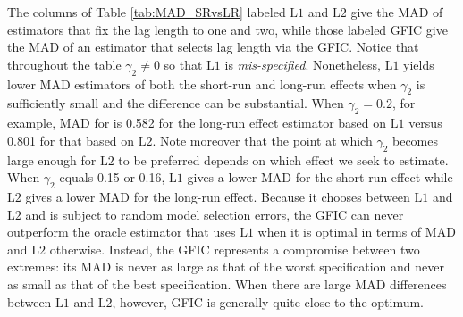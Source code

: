 The columns of Table \ref{tab:MAD_SRvsLR} labeled $\mbox{L1}$ and $\mbox{L2}$ give the MAD of estimators that fix the lag length to one and two, while those labeled GFIC give the MAD of an estimator that selects lag length via the GFIC.
Notice that throughout the table $\gamma_2 \neq 0$ so that $\mbox{L1}$ is \emph{mis-specified}.
Nonetheless, $\mbox{L1}$ yields lower MAD estimators of both the short-run and long-run effects when $\gamma_2$ is sufficiently small and the difference can be substantial.
When $\gamma_2 = 0.2$, for example, MAD for is 0.582 for the long-run effect estimator based on $\mbox{L1}$ versus 0.801 for that based on $\mbox{L2}$.
Note moreover that the point at which $\gamma_2$ becomes large enough for $\mbox{L2}$ to be preferred depends on which effect we seek to estimate.
When $\gamma_2$ equals 0.15 or 0.16, $\mbox{L1}$ gives a lower MAD for the short-run effect while $\mbox{L2}$ gives a lower MAD for the long-run effect.
Because it chooses between $\mbox{L1}$ and $\mbox{L2}$ and is subject to random model selection errors, the GFIC can never outperform the oracle estimator that uses $\mbox{L1}$ when it is optimal in terms of MAD and $\mbox{L2}$ otherwise.
Instead, the GFIC represents a compromise between two extremes: its MAD is never as large as that of the worst specification and never as small as that of the best specification.
When there are large MAD differences between $\mbox{L1}$ and $\mbox{L2}$, however, GFIC is generally quite close to the optimum.



